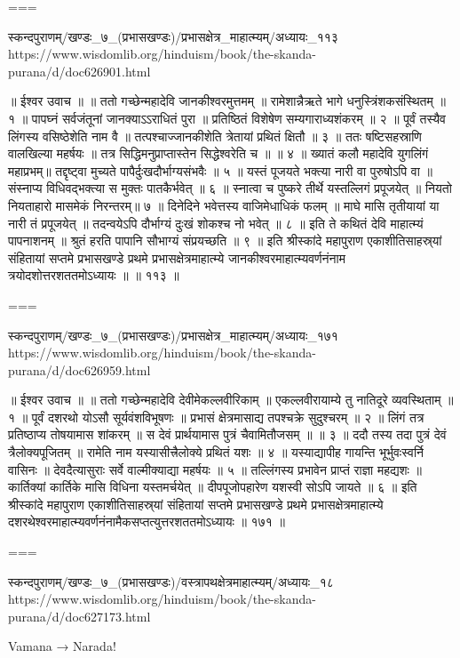 ===

स्कन्दपुराणम्/खण्डः_७_(प्रभासखण्डः)/प्रभासक्षेत्र_माहात्म्यम्/अध्यायः_११३
https://www.wisdomlib.org/hinduism/book/the-skanda-purana/d/doc626901.html

॥ ईश्वर उवाच ॥ ॥
ततो गच्छेन्महादेवि जानकीश्वरमुत्तमम् ॥
रामेशान्नैऋते भागे धनुस्त्रिंशकसंस्थितम् ॥ १ ॥
पापघ्नं सर्वजंतूनां जानक्याऽऽराधितं पुरा ॥
प्रतिष्ठितं विशेषेण सम्यगाराध्यशंकरम् ॥ २ ॥
पूर्वं तस्यैव लिंगस्य वसिष्ठेशेति नाम वै ॥
तत्पश्चाज्जानकीशेति त्रेतायां प्रथितं क्षितौ ॥ ३ ॥
ततः षष्टिसहस्राणि वालखिल्या महर्षयः ॥
तत्र सिद्धिमनुप्राप्तास्तेन सिद्धेश्वरेति च ॥ ॥ ४ ॥
ख्यातं कलौ महादेवि युगलिंगं महाप्रभम्॥
तद्दृष्ट्वा मुच्यते पापैर्दुःखदौर्भाग्यसंभवैः ॥ ५ ॥
यस्तं पूजयते भक्त्या नारी वा पुरुषोऽपि वा ॥
संस्नाप्य विधिवद्भक्त्या स मुक्तः पातकैर्भवेत् ॥ ६ ॥
स्नात्वा च पुष्करे तीर्थे यस्तल्लिगं प्रपूजयेत् ॥
नियतो नियताहारो मासमेकं निरन्तरम्॥ ७ ॥
दिनेदिने भवेत्तस्य वाजिमेधाधिकं फलम् ॥
माघे मासि तृतीयायां या नारी तं प्रपूजयेत् ॥
तदन्वयेऽपि दौर्भाग्यं दुःखं शोकश्च नो भवेत् ॥ ८ ॥
इति ते कथितं देवि माहात्म्यं पापनाशनम् ॥
श्रुतं हरति पापानि सौभाग्यं संप्रयच्छति ॥ ९ ॥
इति श्रीस्कांदे महापुराण एकाशीतिसाहस्र्यां संहितायां सप्तमे प्रभासखण्डे प्रथमे प्रभासक्षेत्रमाहात्म्ये जानकीश्वरमाहात्म्यवर्णनंनाम त्रयोदशोत्तरशततमोऽध्यायः ॥ ॥ ११३ ॥

===

स्कन्दपुराणम्/खण्डः_७_(प्रभासखण्डः)/प्रभासक्षेत्र_माहात्म्यम्/अध्यायः_१७१
https://www.wisdomlib.org/hinduism/book/the-skanda-purana/d/doc626959.html

॥ ईश्वर उवाच ॥ ॥
ततो गच्छेन्महादेवि देवीमेकल्लवीरिकाम् ॥
एकल्लवीरायाम्ये तु नातिदूरे व्यवस्थिताम् ॥ १ ॥
पूर्वं दशरथो योऽसौ सूर्यवंशविभूषणः ॥
प्रभासं क्षेत्रमासाद्य तपश्चक्रे सुदुश्चरम् ॥ २ ॥
लिंगं तत्र प्रतिष्ठाप्य तोषयामास शांकरम् ॥
स देवं प्रार्थयामास पुत्रं चैवामितौजसम् ॥ ॥ ३ ॥
ददौ तस्य तदा पुत्रं देवं त्रैलोक्यपूजितम् ॥
रामेति नाम यस्यासीत्त्रैलोक्ये प्रथितं यशः ॥ ४ ॥
यस्याद्यापीह गायन्ति भूर्भुवःस्वर्नि वासिनः ॥
देवदैत्यासुराः सर्वे वाल्मीक्याद्या महर्षयः ॥ ५ ॥
तल्लिंगस्य प्रभावेन प्राप्तं राज्ञा महद्यशः ॥
कार्तिक्यां कार्तिके मासि विधिना यस्तमर्चयेत् ॥
दीपपूजोपहारेण यशस्वी सोऽपि जायते ॥ ६ ॥
इति श्रीस्कांदे महापुराण एकाशीतिसाहस्र्यां संहितायां सप्तमे प्रभासखण्डे प्रथमे प्रभासक्षेत्रमाहात्म्ये दशरथेश्वरमाहात्म्यवर्णनंनामैकसप्तत्युत्तरशततमोऽध्यायः ॥ १७१ ॥

===

स्कन्दपुराणम्/खण्डः_७_(प्रभासखण्डः)/वस्त्रापथक्षेत्रमाहात्म्यम्/अध्यायः_१८
https://www.wisdomlib.org/hinduism/book/the-skanda-purana/d/doc627173.html

Vamana → Narada!

